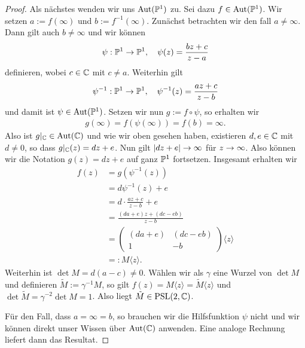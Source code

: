 \begin{proof}
  Als nächstes wenden wir uns $\Aut(\P^1)$ zu. Sei dazu $f \in
  \Aut(\P^1)$. Wir setzen $a:= f(\infty)$ und $b :=
  f^{-1}(\infty)$. Zunächst betrachten wir den fall $a \neq
  \infty$. Dann gilt auch $b \neq \infty$ und wir können
  \[
  \psi: \P^1 \ra \P^1, \quad \psi(z) = \frac{bz + c}{z - a}
  \]
  definieren, wobei $c \in \C$ mit $c \neq a$. Weiterhin gilt
  \[
  \psi^{-1}: \P^1 \ra \P^1, \quad \psi^{-1}(z) = \frac{az +c}{z -b}
  \]
  und damit ist $\psi \in \Aut(\P^1)$. Setzen wir nun $g := f \circ
  \psi$, so erhalten wir
  \begin{align*}
    g(\infty) = f(\psi(\infty)) = f(b) = \infty.
  \end{align*}
  Also ist $g|_\C \in \Aut(\C)$ und wie wir oben gesehen haben,
  existieren $d,e \in \C$ mit $d \neq 0$, so dass $g|_\C(z) = dz +
  e$. Nun gilt $|dz + e| \ra \infty$ für $z \ra \infty$. Also können
  wir die Notation $g(z) = dz+e$ auf ganz $\P^1$ fortsetzen. Insgesamt
  erhalten wir
  \begin{align*}
    f(z) & = g(\psi^{-1}(z)) \\
    & = d\psi^{-1}(z) + e \\
    & = d \cdot \frac{az + c}{z - b} + e \\
    & = \frac{(da + e) z + (dc - eb)}{z - b} \\
    & =
    \begin{pmatrix}
      (da + e) & (dc - eb) \\
      1 & -b
    \end{pmatrix}\langle z \rangle \\
    & =: M\langle z \rangle.
  \end{align*}
  Weiterhin ist $\det M = d( a-c) \neq 0$. Wählen wir als $\gamma$
  eine Wurzel von $\det M$ und definieren $\tilde M := \gamma^{-1} M$,
  so gilt $f(z) = M\langle z \rangle = \tilde M \langle z \rangle$ und
  $\det \tilde M = \gamma^{-2} \det M = 1$. Also liegt $\tilde M \in
  \PSL(2, \C)$.

  Für den Fall, dass $a = \infty = b$, so brauchen wir die
  Hilfsfunktion $\psi$ nicht und wir können direkt unser Wissen über
  $\Aut(\C)$ anwenden. Eine analoge Rechnung liefert dann das
  Resultat.


\end{proof}
